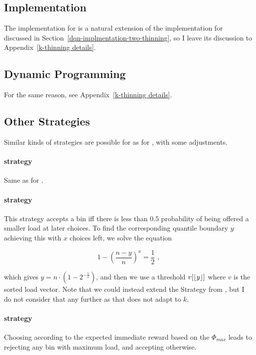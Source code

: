 \subsection{\DQL Implementation} \label{dqn-implementation-k-thinning}

The \DQL implementation for \KThinning is a natural extension of the implementation for \TwoThinning discussed in Section~\ref{dqn-implmentation-two-thinning}, so I leave its discussion to Appendix~\ref{k-thinning details}.


\subsection{Dynamic Programming} \label{k-thinning-dp}

For the same reason, see Appendix~\ref{k-thinning details}.


\subsection{Other Strategies} \label{k-thinning-otherstrategies}

Similar kinds of strategies are possible for \KThinning as for \TwoThinning, with some adjustments.

\paragraph{\AlwaysAccept strategy} Same as for \TwoThinning.


\paragraph{\Quantile strategy} This strategy accepts a bin iff there is less than $0.5$ probability of being offered a smaller load at later choices. To find the corresponding quantile boundary $y$ achieving this with $x$ choices left, we solve the equation

\begin{equation} \label{quantilekthinning}
1 - \left(\frac{n-y}{n}\right)^x = \frac{1}{2} \text{ ,}
\end{equation}

which gives $y = n \cdot  \left(1 - 2^{-\frac{1}{x}}\right)$, and then we use a threshold $v[\lfloor y\rfloor]$ where $v$ is the sorted load vector. Note that we could instead extend the \MeanThinning Strategy from \TwoThinning, but I do not consider that any further as that does not adapt to $k$.


\paragraph{\LocalRewardOptimiser strategy} Choosing according to the expected immediate reward based on the $\Phi_{max}$ leads to rejecting any bin with maximum load, and accepting otherwise.


